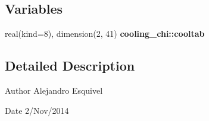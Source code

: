 \subsection*{Variables}
\begin{DoxyCompactItemize}
\item 
\hypertarget{namespacecooling__chi_a37baf8c1757edb98fcaa8b62587d7b2f}{}real(kind=8), dimension(2, 41) {\bfseries cooling\+\_\+chi\+::cooltab}\label{namespacecooling__chi_a37baf8c1757edb98fcaa8b62587d7b2f}

\end{DoxyCompactItemize}


\subsection{Detailed Description}
\begin{DoxyAuthor}{Author}
Alejandro Esquivel 
\end{DoxyAuthor}
\begin{DoxyDate}{Date}
2/\+Nov/2014 
\end{DoxyDate}
